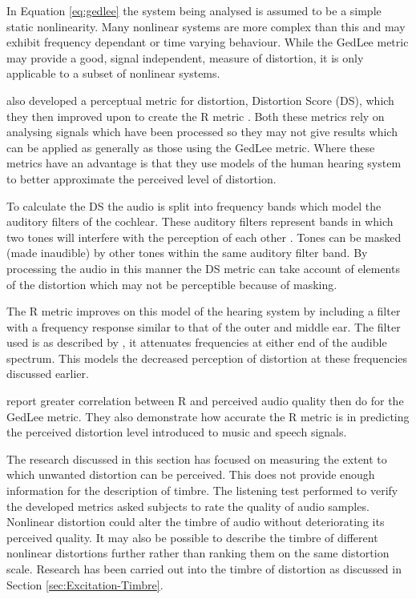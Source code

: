 		In Equation \ref{eq:gedlee} the system being analysed is assumed to be a simple static nonlinearity. Many
		nonlinear systems are more complex than this and may exhibit frequency dependant or time varying behaviour.
		While the GedLee metric may provide a good, signal independent, measure of distortion, it is only
		applicable to a subset of nonlinear systems.

		\citet{tan2003the} also developed a perceptual metric for distortion, Distortion Score (DS), which they
		then improved upon to create the R metric \citep{tan2004predicting}. Both these metrics rely on
		analysing signals which have been processed so they may not give results which can be applied as generally
		as those using the GedLee metric. Where these metrics have an advantage is that they use models of the
		human hearing system to better approximate the perceived level of distortion.

		To calculate the DS the audio is split into frequency bands which model the auditory filters of the
		cochlear. These auditory filters represent bands in which two tones will interfere with the perception of
		each other \citep{fastl2007psychoacoustics}. Tones can be masked (made inaudible) by other tones within the
		same auditory filter band. By processing the audio in this manner the DS metric can take account of
		elements of the distortion which may not be perceptible because of masking.
		
		The R metric improves on this model of the hearing system by including a filter with a
		frequency response similar to that of the outer and middle ear. The filter used is as described by
		\citet{glasberg2002a}, it attenuates frequencies at either end of the audible spectrum. This models the
		decreased perception of distortion at these frequencies discussed earlier.

		\citet{tan2004predicting} report greater correlation between R and perceived audio quality then
		\citet{lee2003auditory} do for the GedLee metric. They also demonstrate how accurate the R
		metric is in predicting the perceived distortion level introduced to music and speech signals.

		The research discussed in this section has focused on measuring the extent to which unwanted distortion can
		be perceived. This does not provide enough information for the description of timbre. The listening test
		performed to verify the developed metrics asked subjects to rate the quality of audio samples. Nonlinear
		distortion could alter the timbre of audio without deteriorating its perceived quality. It may also be
		possible to describe the timbre of different nonlinear distortions further rather than ranking them on the
		same distortion scale. Research has been carried out into the timbre of distortion as discussed in Section
		\ref{sec:Excitation-Timbre}.

